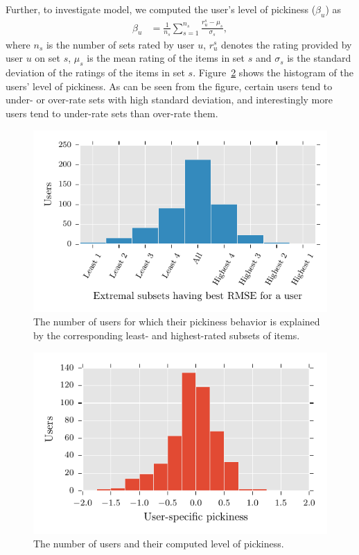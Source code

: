 Further, to investigate \VO model, we computed the user's level of pickiness ($\beta_u$) as 
%
\begin{equation} \label{pickinessEq}
  \begin{split}
    \beta_u &= \frac{1}{n_s}\sum_{s = 1}^{n_s} \frac{r_{u}^s - \mu_s} {\sigma_s},
  \end{split}
\end{equation}
%
where $n_s$ is the number of sets rated by user $u$, $r_{u}^s$ denotes the rating
provided by user $u$ on set $s$, $\mu_s$ is the mean rating of the items in set $s$
and $\sigma_s$ is the standard deviation of the ratings of the items in set $s$.
Figure~\ref{fig:pickiHist} shows the histogram of the  users' level of pickiness. As
can be seen from the figure,  certain users tend to under- or over-rate sets with
high standard deviation, and interestingly more users tend to under-rate sets than
over-rate them. 

\begin{figure}[tb]
  \centerline{\includegraphics[scale=0.8]{figures/extremalHist.pdf}}
  \caption{The number of users for which their pickiness behavior is explained
  by the corresponding least- and highest-rated subsets of
items.}
  \label{fig:extremal}
\end{figure}


\begin{figure}[tb]
  \centerline{\includegraphics[scale=0.9]{figures/pickiHist.pdf}}
  \caption{The number of users and their computed level of pickiness.}
  \label{fig:pickiHist}
\end{figure}



